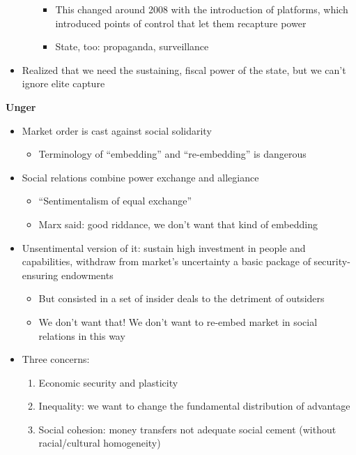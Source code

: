 \begin{itemize}
\begin{itemize}
    \begin{itemize}
    \tightlist
    \item
      This changed around 2008 with the introduction of platforms, which
      introduced points of control that let them recapture power
    \item
      State, too: propaganda, surveillance
    \end{itemize}
  \end{itemize}
\item
  Realized that we need the sustaining, fiscal power of the state, but
  we can't ignore elite capture
\end{itemize}

\textbf{Unger}

\begin{itemize}
\tightlist
\item
  Market order is cast against social solidarity

  \begin{itemize}
  \tightlist
  \item
    Terminology of ``embedding'' and ``re-embedding'' is dangerous
  \end{itemize}
\item
  Social relations combine power exchange and allegiance

  \begin{itemize}
  \tightlist
  \item
    ``Sentimentalism of equal exchange''
  \item
    Marx said: good riddance, we don't want that kind of embedding
  \end{itemize}
\item
  Unsentimental version of it: sustain high investment in people and
  capabilities, withdraw from market's uncertainty a basic package of
  security-ensuring endowments

  \begin{itemize}
  \tightlist
  \item
    But consisted in a set of insider deals to the detriment of
    outsiders
  \item
    We don't want that! We don't want to re-embed market in social
    relations in this way
  \end{itemize}
\item
  Three concerns:

  \begin{enumerate}
  \def\labelenumi{\arabic{enumi}.}
  \tightlist
  \item
    Economic security and plasticity
  \item
    Inequality: we want to change the fundamental distribution of
    advantage
  \item
    Social cohesion: money transfers not adequate social cement (without
    racial/cultural homogeneity)


\end{enumerate}
\end{itemize}

